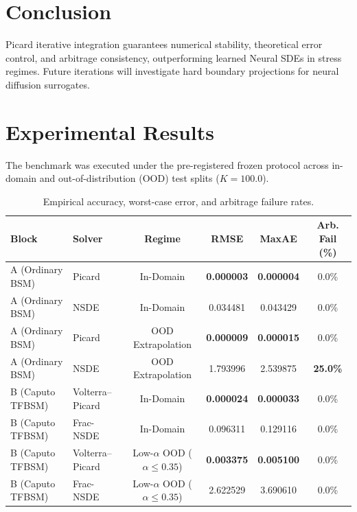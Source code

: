 \documentclass[10pt,twocolumn,a4paper]{article}
\begin{document}
\section{Conclusion}
Picard iterative integration guarantees numerical stability, theoretical error control, and arbitrage consistency, outperforming learned Neural SDEs in stress regimes. Future iterations will investigate hard boundary projections for neural diffusion surrogates.
\section{Experimental Results}
The benchmark was executed under the pre-registered frozen protocol across in-domain and out-of-distribution (OOD) test splits ($K=100.0$).

\begin{table}[h]
\centering
\small
\begin{tabular}{@{}llcccc@{}}
\toprule
\textbf{Block} & \textbf{Solver} & \textbf{Regime} & \textbf{RMSE} & \textbf{MaxAE} & \textbf{Arb. Fail (\%)} \\ \midrule
A (Ordinary BSM) & Picard & In-Domain & \textbf{0.000003} & \textbf{0.000004} & 0.0\% \\
A (Ordinary BSM) & NSDE & In-Domain & 0.034481 & 0.043429 & 0.0\% \\
A (Ordinary BSM) & Picard & OOD Extrapolation & \textbf{0.000009} & \textbf{0.000015} & 0.0\% \\
A (Ordinary BSM) & NSDE & OOD Extrapolation & 1.793996 & 2.539875 & \textbf{25.0\%} \\ \midrule
B (Caputo TFBSM) & Volterra--Picard & In-Domain & \textbf{0.000024} & \textbf{0.000033} & 0.0\% \\
B (Caputo TFBSM) & Frac-NSDE & In-Domain & 0.096311 & 0.129116 & 0.0\% \\
B (Caputo TFBSM) & Volterra--Picard & Low-$\alpha$ OOD ($\alpha \le 0.35$) & \textbf{0.003375} & \textbf{0.005100} & 0.0\% \\
B (Caputo TFBSM) & Frac-NSDE & Low-$\alpha$ OOD ($\alpha \le 0.35$) & 2.622529 & 3.690610 & 0.0\% \\ \bottomrule
\end{tabular}
\caption{Empirical accuracy, worst-case error, and arbitrage failure rates.}
\end{table}
\end{document}

